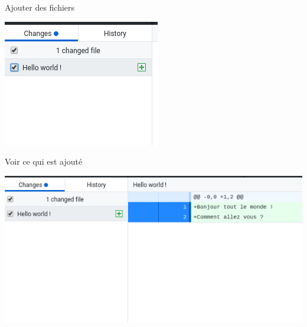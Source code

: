 \documentclass{beamer}
\begin{document}
\begin{frame}{Ajouter des fichiers}
	\begin{center}
	    \includegraphics[scale=0.5]{img/github_desktop/add_files.png}
	\end{center}
\end{frame}

\begin{frame}{Voir ce qui est ajouté}
	\begin{center}
	    \includegraphics[scale=0.5]{img/github_desktop/see_added.png}
	\end{center}
\end{frame}
\end{document}
